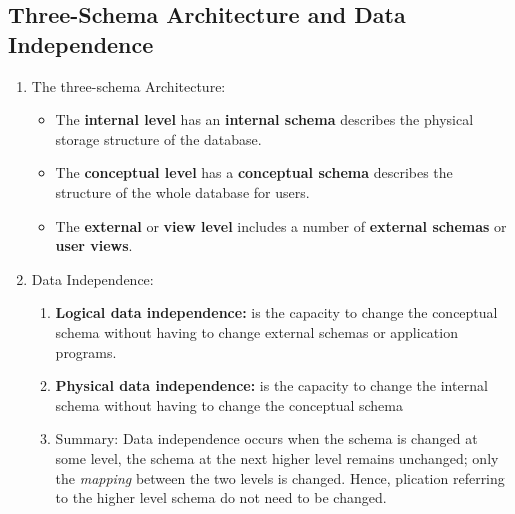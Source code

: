 \documentclass[10pt]{article}
\begin{document}
\subsection{Three-Schema Architecture and Data Independence}
\begin{enumerate}
	\item The three-schema Architecture: \\
	

	\begin{itemize}
		\item The \textbf{internal level} has an \textbf{internal schema} describes the physical storage structure of the database.
		\item The \textbf{conceptual level} has a \textbf{conceptual schema} describes the structure of the whole database for users.
		\item The \textbf{external} or \textbf{view level} includes a number of \textbf{external schemas} or \textbf{user views}.
	\end{itemize}

	\item Data Independence: 
	\begin{enumerate}
		\item \textbf{Logical data independence:} is the capacity to change the conceptual schema without having to change external schemas or application programs.
		\item \textbf{Physical data independence:} is the capacity to change the internal schema without having to change the conceptual schema
		\item Summary: Data independence occurs when the schema is changed at some level, the schema at the next higher level remains unchanged; only the \textit{mapping} between the two levels is changed. Hence, plication referring to the higher level schema do not need to be changed.

		\bigbreak
		\bigbreak 
	\end{enumerate}
\end{enumerate}
\end{document}
